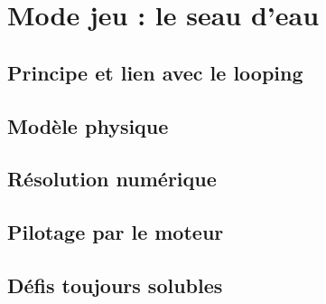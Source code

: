 
\chapter{Mode jeu : le seau d'eau}\label{chap:jeu}

\section{Principe et lien avec le looping}

\section{Modèle physique}

\section{Résolution numérique}

\section{Pilotage par le moteur}

\section{Défis toujours solubles}
